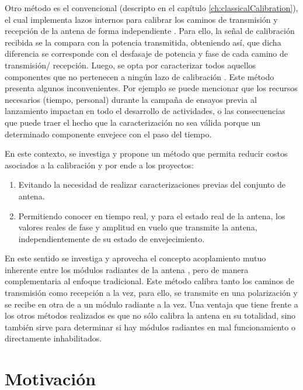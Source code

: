 Otro método es el convencional (descripto en el capítulo \ref{ch:classicalCalibration}), el cual implementa lazos internos
para calibrar los caminos de transmisión y recepción de la antena de forma independiente \cite{Makhoul2012}
\cite{Luscombe1990}\cite{Seifert1996}\cite{Dall1994}\cite{Freeman1995}\cite{Bibby2003}\cite{Bast2003}\cite{Stove2004}
\cite{Srivastava1996}\cite{Wang2010}. Para ello, la señal de calibración recibida se la compara con la potencia transmitida,
obteniendo así, que dicha diferencia se corresponde con el desfasaje de potencia y fase de cada camino de transmisión/
recepción. Luego, se opta por caracterizar todos aquellos componentes que no pertenecen a ningún lazo de calibración
\cite{Freeman1995}. Este método presenta algunos inconvenientes. Por ejemplo se puede mencionar que los recursos necesarios
(tiempo, personal) durante la campaña de ensayos previa al lanzamiento impactan en todo el desarrollo de actividades,
o las consecuencias que puede traer el hecho que la caracterización no sea válida porque un determinado componente
envejece con el paso del tiempo.

En este contexto, se investiga y propone un método que permita reducir costos asociados a la calibración y por ende a los
proyectos:

\begin{enumerate}
    \item Evitando la necesidad de realizar caracterizaciones previas del conjunto de antena.
    \item Permitiendo conocer en tiempo real, y para el estado real de la antena, los valores reales de fase y amplitud en
		vuelo que transmite la antena, independientemente de su estado de envejecimiento.
\end{enumerate}

En este sentido se investiga y aprovecha el concepto acoplamiento mutuo inherente entre los módulos radiantes de la antena
\cite{Aumann1989}, pero de manera complementaria al enfoque tradicional. Este método calibra tanto los caminos de transmisión
como recepción a la vez, para ello, se transmite en una polarización y se recibe en otra de a un módulo radiante a la vez.
Una ventaja que tiene frente a los otros métodos realizados es que no sólo calibra la antena en su totalidad, sino también
sirve para determinar si hay módulos radiantes en mal funcionamiento o directamente inhabilitados.

\section{Motivación} \label{sc:motivation}

